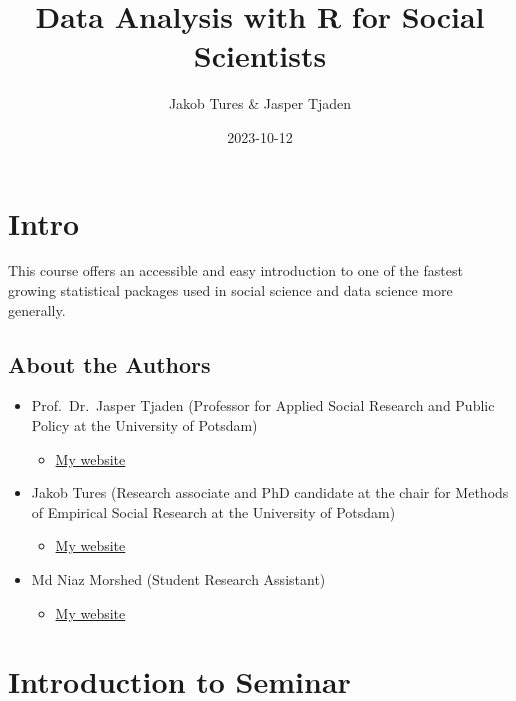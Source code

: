 \documentclass[
]{book}
\title{Data Analysis with R for Social Scientists}
\author{Jakob Tures \& Jasper Tjaden}
\date{2023-10-12}
\providecommand{\tightlist}{%
  \setlength{\itemsep}{0pt}\setlength{\parskip}{0pt}}
\begin{document}
\maketitle

{
\setcounter{tocdepth}{1}
\tableofcontents
}
\hypertarget{intro}{%
\chapter*{Intro}\label{intro}}

This course offers an accessible and easy introduction to one of the fastest growing statistical packages used in social science and data science more generally.

\hypertarget{about-the-authors}{%
\section{About the Authors}\label{about-the-authors}}

\begin{itemize}
\tightlist
\item
  Prof.~Dr.~Jasper Tjaden (Professor for Applied Social Research and Public Policy at the University of Potsdam)

  \begin{itemize}
  \tightlist
  \item
    \href{https://jaspertjaden.com}{My website}
  \end{itemize}
\item
  Jakob Tures (Research associate and PhD candidate at the chair for Methods of Empirical Social Research at the University of Potsdam)

  \begin{itemize}
  \tightlist
  \item
    \href{https://www.uni-potsdam.de/de/soziologie-methoden/team/jakob-tures}{My website}
  \end{itemize}
\item
  Md Niaz Morshed (Student Research Assistant)

  \begin{itemize}
  \tightlist
  \item
    \href{https://n1az.github.io/}{My website}
  \end{itemize}
\end{itemize}

\hypertarget{intro-sem}{%
\chapter{Introduction to Seminar}\label{intro-sem}}
\end{document}
